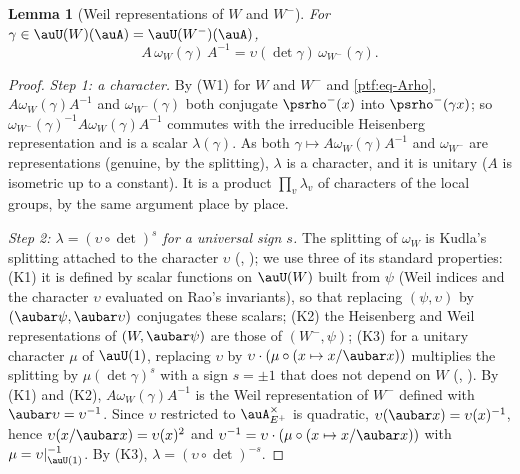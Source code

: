 \documentclass[10pt]{amsart}
\newtheorem{lemma}[theorem]{Lemma}
\theoremstyle{definition}
\theoremstyle{remark}
\begin{document}
\begin{lemma}[Weil representations of $W$ and $W^-$]\label{ptf:weil}
For $\gamma\in\auU(W)(\auA)=\auU(W^-)(\auA)$,
\begin{equation}\label{ptf:eq-Aomega}
A\,\omega_W(\gamma)\,A^{-1}=\upsilon(\det\gamma)\,\omega_{W^-}(\gamma).
\end{equation}
\end{lemma}
\begin{proof}
\emph{Step 1: a character.} By (W1) for $W$ and $W^-$ and \eqref{ptf:eq-Arho}, $A\omega_W(\gamma)A^{-1}$
and $\omega_{W^-}(\gamma)$ both conjugate $\psrho^-(x)$ into $\psrho^-(\gamma x)$; so
$\omega_{W^-}(\gamma)^{-1}A\omega_W(\gamma)A^{-1}$ commutes with the irreducible Heisenberg representation
and is a scalar $\lambda(\gamma)$. As both $\gamma\mapsto A\omega_W(\gamma)A^{-1}$ and $\omega_{W^-}$ are
representations (genuine, by the splitting), $\lambda$ is a character, and it is unitary ($A$ is
isometric up to a constant). It is a product $\prod_v\lambda_v$ of characters of the local groups, by
the same argument place by place.

\emph{Step 2: $\lambda=(\upsilon\circ\det)^s$ for a universal sign $s$.} The splitting of $\omega_W$ is
Kudla's splitting attached to the character $\upsilon$ ({\cite[\S5.1.1]{P49}}, \cite[Theorem~3.1]{KudlaSplitting}); we
use three of its standard properties: (K1) it is defined by scalar functions on $\auU(W)$ built from
$\psi$ (Weil indices and the character $\upsilon$ evaluated on Rao's invariants), so that replacing
$(\psi,\upsilon)$ by $(\aubar\psi,\aubar\upsilon)$ conjugates these scalars; (K2) the Heisenberg and Weil
representations of $(W,\aubar\psi)$ are those of $(W^-,\psi)$; (K3) for a unitary character $\mu$ of
$\auU(1)$, replacing $\upsilon$ by $\upsilon\cdot(\mu\circ(x\mapsto x/\aubar x))$ multiplies the splitting by
$\mu(\det\gamma)^{s}$ with a sign $s=\pm1$ that does not depend on $W$ (\cite[p.~385 and Lemma~3.5]{KudlaSplitting}, \cite[(1.7)--(1.8)]{HKS}). By (K1) and (K2), $A\omega_W(\gamma)A^{-1}$ is the Weil representation of $W^-$ defined
with $\aubar\upsilon=\upsilon^{-1}$. Since $\upsilon$ restricted to $\auA_{E^+}^\times$ is quadratic,
$\upsilon(\aubar x)=\upsilon(x)^{-1}$, hence $\upsilon(x/\aubar x)=\upsilon(x)^2$ and $\upsilon^{-1}=\upsilon\cdot
(\mu\circ(x\mapsto x/\aubar x))$ with $\mu=\upsilon|_{\auU(1)}^{-1}$. By (K3), $\lambda=(\upsilon\circ\det)^{-s}$.


\end{proof}
\end{document}
